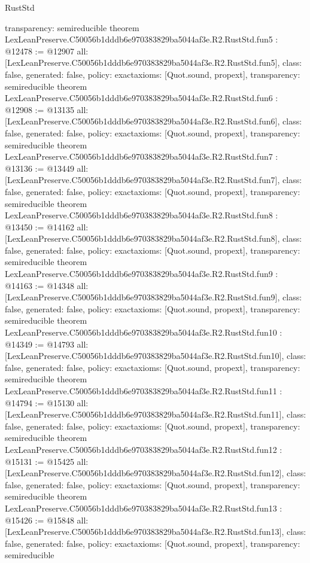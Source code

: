 \begin{lexlean}{RustStd}
\begin{coremodule}
{  transparency: semireducible
}
theorem LexLeanPreserve.C50056b1dddb6e970383829ba5044af3e.R2.RustStd.fun5 : @12478 := @12907 {
  all: [LexLeanPreserve.C50056b1dddb6e970383829ba5044af3e.R2.RustStd.fun5],
  class: false,
  generated: false,
  policy: exact{axioms: [Quot.sound, propext]},
  transparency: semireducible
}
theorem LexLeanPreserve.C50056b1dddb6e970383829ba5044af3e.R2.RustStd.fun6 : @12908 := @13135 {
  all: [LexLeanPreserve.C50056b1dddb6e970383829ba5044af3e.R2.RustStd.fun6],
  class: false,
  generated: false,
  policy: exact{axioms: [Quot.sound, propext]},
  transparency: semireducible
}
theorem LexLeanPreserve.C50056b1dddb6e970383829ba5044af3e.R2.RustStd.fun7 : @13136 := @13449 {
  all: [LexLeanPreserve.C50056b1dddb6e970383829ba5044af3e.R2.RustStd.fun7],
  class: false,
  generated: false,
  policy: exact{axioms: [Quot.sound, propext]},
  transparency: semireducible
}
theorem LexLeanPreserve.C50056b1dddb6e970383829ba5044af3e.R2.RustStd.fun8 : @13450 := @14162 {
  all: [LexLeanPreserve.C50056b1dddb6e970383829ba5044af3e.R2.RustStd.fun8],
  class: false,
  generated: false,
  policy: exact{axioms: [Quot.sound, propext]},
  transparency: semireducible
}
theorem LexLeanPreserve.C50056b1dddb6e970383829ba5044af3e.R2.RustStd.fun9 : @14163 := @14348 {
  all: [LexLeanPreserve.C50056b1dddb6e970383829ba5044af3e.R2.RustStd.fun9],
  class: false,
  generated: false,
  policy: exact{axioms: [Quot.sound, propext]},
  transparency: semireducible
}
theorem LexLeanPreserve.C50056b1dddb6e970383829ba5044af3e.R2.RustStd.fun10 : @14349 := @14793 {
  all: [LexLeanPreserve.C50056b1dddb6e970383829ba5044af3e.R2.RustStd.fun10],
  class: false,
  generated: false,
  policy: exact{axioms: [Quot.sound, propext]},
  transparency: semireducible
}
theorem LexLeanPreserve.C50056b1dddb6e970383829ba5044af3e.R2.RustStd.fun11 : @14794 := @15130 {
  all: [LexLeanPreserve.C50056b1dddb6e970383829ba5044af3e.R2.RustStd.fun11],
  class: false,
  generated: false,
  policy: exact{axioms: [Quot.sound, propext]},
  transparency: semireducible
}
theorem LexLeanPreserve.C50056b1dddb6e970383829ba5044af3e.R2.RustStd.fun12 : @15131 := @15425 {
  all: [LexLeanPreserve.C50056b1dddb6e970383829ba5044af3e.R2.RustStd.fun12],
  class: false,
  generated: false,
  policy: exact{axioms: [Quot.sound, propext]},
  transparency: semireducible
}
theorem LexLeanPreserve.C50056b1dddb6e970383829ba5044af3e.R2.RustStd.fun13 : @15426 := @15848 {
  all: [LexLeanPreserve.C50056b1dddb6e970383829ba5044af3e.R2.RustStd.fun13],
  class: false,
  generated: false,
  policy: exact{axioms: [Quot.sound, propext]},
  transparency: semireducible
}
\end{coremodule}
\end{lexlean}
